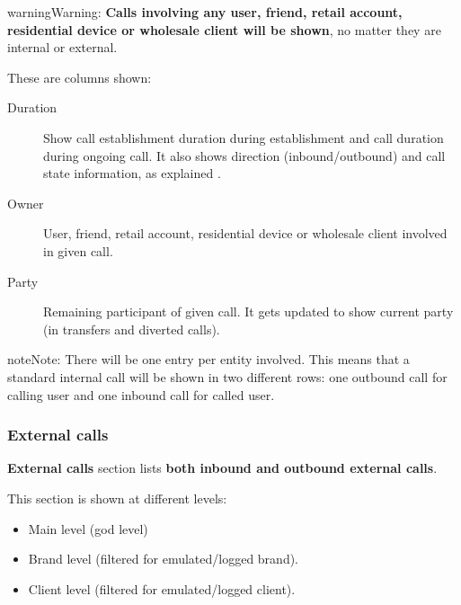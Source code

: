 \documentclass[letterpaper,10pt,english]{sphinxmanual}
\begin{document}
\begin{notice}{warning}{Warning:}
\textbf{Calls involving any user, friend, retail account, residential device or wholesale client will be shown},
no matter they are internal or external.
\end{notice}

These are columns shown:
\begin{description}
\item[{Duration}] \leavevmode{}\label{administration_portal/client/vpbx/calls/active_calls:term-duration}
Show call establishment duration during establishment and call duration during ongoing call. It also shows
direction (inbound/outbound) and call state information, as explained {\hyperref[administration_portal/platform/active_calls:call\string-state]{}}.

\item[{Owner}] \leavevmode{}\label{administration_portal/client/vpbx/calls/active_calls:term-owner}
User, friend, retail account, residential device or wholesale client involved in given call.

\item[{Party}] \leavevmode{}\label{administration_portal/client/vpbx/calls/active_calls:term-party}
Remaining participant of given call. It gets updated to show current party (in transfers and diverted calls).

\end{description}

\begin{notice}{note}{Note:}
There will be one entry per entity involved. This means that a standard internal call will be shown
in two different rows: one outbound call for calling user and one inbound call for called user.
\end{notice}


\subsubsection{External calls}
\label{administration_portal/client/vpbx/calls/external_calls:id1}\label{administration_portal/client/vpbx/calls/external_calls::doc}\label{administration_portal/client/vpbx/calls/external_calls:external-calls}
\textbf{External calls} section lists \textbf{both inbound and outbound external calls}.

This section is shown at different levels:
\begin{itemize}
\item {} 
Main level (god level)

\item {} 
Brand level (filtered for emulated/logged brand).

\item {} 
Client level (filtered for emulated/logged client).

\end{itemize}
\end{document}
